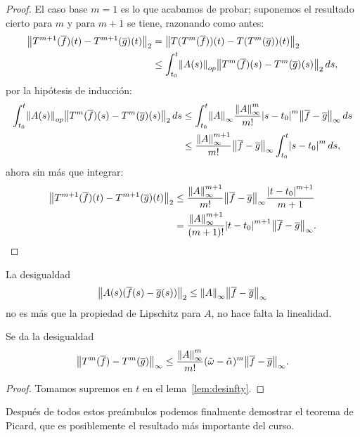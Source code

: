 \documentclass[../ecuaciones_diferenciales.tex]{subfiles}
\begin{document}
\begin{proof}
	El caso base \(m = 1\) es lo que acabamos de probar; suponemos el resultado
    cierto para \(m\) y para \(m + 1\) se tiene, razonando como antes:
	\begin{align*}
		\norm{T^{m + 1}(\vec{f})(t) - T^{m + 1}(\vec{g})(t)}_2
		 & = \norm{T(T^m(\vec{f}))(t) - T(T^m (\vec{g}))(t)}_2 \\
		 & \leq \int_{t_0}^t \norm{A(s)}_{op}
		\norm{T^m(\vec{f})(s) - T^m (\vec{g})(s)}_2 \dif s,
	\end{align*}
	por la hipótesis de inducción:
	\begin{align*}
		\int_{t_0}^t \norm{A(s)}_{op}
		\norm{T^m(\vec{f})(s) - T^m(\vec{g})(s)}_2 \dif s
		 & \leq \int_{t_0}^t \norm{A}_\infty
		\frac{\norm{A}^m_\infty}{m!} \abs{s - t_0}^m
		\norm{\vec{f} - \vec{g}}_\infty \dif s \\
		 & \leq \frac{\norm{A}^{m + 1}_\infty}{m!}
		 \norm{\vec{f} - \vec{g}}_\infty \int_{t_0}^t \abs{s - t_0}^m \dif s,
	\end{align*}
	ahora sin más que integrar:
	\begin{align*}
		\norm{T^{m + 1}(\vec{f})(t) - T^{m + 1}(\vec{g})(t)}_2
		&\leq \frac{\norm{A}^{m + 1}_\infty}{m!}
		 	\norm{\vec{f} - \vec{g}}_\infty \frac{\abs{t - t_0}^{m + 1}}{m + 1}
		\\
		&= \frac{\norm{A}^{m + 1}_\infty}{(m + 1)!} \abs{t - t_0}^{m + 1}
		\norm{\vec{f} - \vec{g}}_\infty.
	\end{align*}
\end{proof}

\begin{remark}
	La desigualdad
	\[\norm{A(s)(\vec{f}(s) - \vec{g}(s))}_2
		\leq \norm{A}_\infty \norm{\vec{f} - \vec{g}}_\infty\]
	no es más que la propiedad de Lipschitz para \(A\),
	no hace falta la linealidad.
\end{remark}

\begin{corollary} \label{cor:T_norm_infty_ineq}
	Se da la desigualdad
	\[\norm{T^m(\vec{f}) - T^m(\vec{g})}_\infty
		\leq \frac{\norm{A}^m_\infty}{m!} (\tilde{\omega} - \tilde{\alpha})^m
		\norm{\vec{f} - \vec{g}}_\infty.\]
\end{corollary}

\begin{proof}
	Tomamos supremos en \(t\) en el lema~\ref{lem:desinfty}.
\end{proof}

Después de todos estos preámbulos podemos finalmente demostrar el teorema de
Picard, que es posiblemente el resultado más importante del curso.
\end{document}
